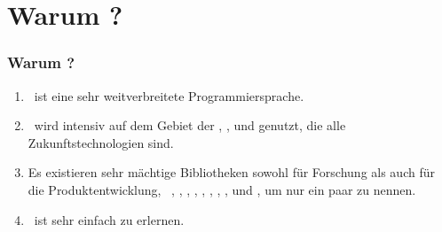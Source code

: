 \documentclass[aspectratio=169,mathserif,notheorems]{beamer}%
\begin{document}
\section{Warum \python?}%
%
\begin{frame}[t]%
\frametitle{Warum \python?}%
\begin{enumerate}%
\item \python\ ist eine sehr weitverbreitete Programmiersprache\cite{CBST2024LOHPPTDDSAMLA,B2023G2GLS}.%
%
\item<5-> \python\ wird intensiv auf dem Gebiet der \cite{RN2022AIAMA}, \cite{SSBD2014UMLFTTA}, und \cite{G2019DSFSFPWP} genutzt, die alle Zukunftstechnologien sind.%
%
\item<6-> Es existieren sehr mächtige Bibliotheken sowohl für Forschung als auch für die Produktentwicklung, \DEzB~\numpy\cite{HMvdWGVCWTBSKPHvKBHFdRWPGMSRWAGO2020APWN,DBvR2024ITN,J2018NPSCADSAWNSAM}, \pandas\cite{B2012DPWP,L2024PW}, \scikitlearn\cite{PVGMTGBPWDVPCBPD2011SMLIP,RLM2022MLWPAS}, \scipy\cite{VGOHRCBPWBvdWBWMMNJKLCPFMVLPCHQHARPvMS2020SFAFSCIP,J2018NPSCADSAWNSAM}, \tensorflow\cite{ABCCDDDGIIKLMMMSTVWWYZ2016TASFLSML,L2023TDDBTADMLMWT}, \pytorch\cite{PGMLBCKLGADKYDRTCSFBC2019PAISHPDLL,RLM2022MLWPAS}, \matplotlib\cite{H2007MA2GE,P2021HOMLPAVWP,J2018NPSCADSAWNSAM}, \simpy\cite{Z2024DESIEWS}, und \moptipy\cite{WW2023RSDEWASSAA}, um nur ein paar zu nennen.%
%
\item<7-> \python\ ist sehr einfach zu erlernen\cite{GPBS2006WCTIPIHSUP,VR1999CPFERPASEFTPOT}.%
%
\end{enumerate}%
%
%
\end{frame}%
%
%
\end{document}
